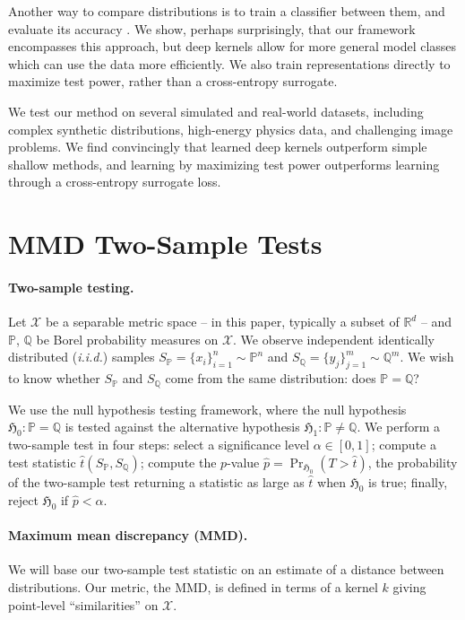 \documentclass{article}
\newcommand{\R}{\mathbb{R}} \renewcommand{\H}{\mathcal{H}} \newcommand{\N}{\mathcal{N}} \newcommand{\X}{\mathcal{X}} \renewcommand{\P}{\mathbb{P}} \newcommand{\Q}{\mathbb{Q}} \DeclareMathOperator{\E}{\mathbb{E}} \DeclareMathOperator{\Var}{Var}
\newcommand{\nullhyp}{\mathfrak{H}_0}
\newcommand{\althyp}{\mathfrak{H}_1}
\begin{document}
Another way to compare distributions is to train a classifier between them, and evaluate its accuracy \citep{Lopez:C2ST}.
We show, perhaps surprisingly, that our framework encompasses this approach,
but deep kernels allow for more general model classes which can use the data more efficiently.
We also train representations
directly to maximize test power,
rather than a cross-entropy surrogate.

We test our method on several simulated and real-world datasets,
including complex synthetic distributions,
high-energy physics data,
and challenging image problems.
We find convincingly that learned deep kernels outperform simple shallow methods,
and learning by maximizing test power
outperforms learning through a cross-entropy surrogate loss.







\section{MMD Two-Sample Tests}\label{sec:background}
\paragraph{Two-sample testing.}
Let $\X$ be a separable metric space
-- in this paper, typically a subset of $\R^d$ --
and $\P$, $\Q$ be Borel probability measures on $\X$.
We observe independent identically distributed (\emph{i.i.d.}) samples $S_\P=\{x_i\}_{i=1}^n \sim \P^n$ and $S_\Q=\{y_j\}_{j=1}^m \sim \Q^m$.
We wish to know whether $S_\P$ and $S_\Q$ come from the same distribution:
does $\P=\Q$?

We use the null hypothesis testing framework,
where  the null hypothesis $\nullhyp: \P=\Q$ is tested against the alternative hypothesis $\althyp: \P \neq \Q$.
We perform a two-sample test in four steps:
select a significance level $\alpha \in [0,1]$;
compute a test statistic $\hat{t}(S_\P, S_\Q)$;
compute the $p$-value $\hat{p}= \Pr_{\nullhyp}(T>\hat{t})$, the probability of the two-sample test returning a statistic as large as $\hat{t}$ when $\nullhyp$ is true;
finally, reject $\nullhyp$ if $\hat{p} < \alpha$.

\paragraph{Maximum mean discrepancy (MMD).}
We will base our two-sample test statistic
on an estimate of a distance between distributions.
Our metric, the MMD,
is defined in terms of a kernel $k$
giving point-level ``similarities'' on $\X$.
\end{document}
